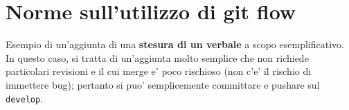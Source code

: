 \chapter{Norme sull'utilizzo di git flow}


Esempio di un'aggiunta di una \textbf{stesura di un verbale} a scopo esemplificativo. \\
In questo caso, si tratta di un'aggiunta molto semplice che non richiede particolari revisioni e il cui merge e' poco rischioso (non c'e' il rischio di immettere bug); pertanto si puo' semplicemente committare e pushare sul \texttt{develop}.